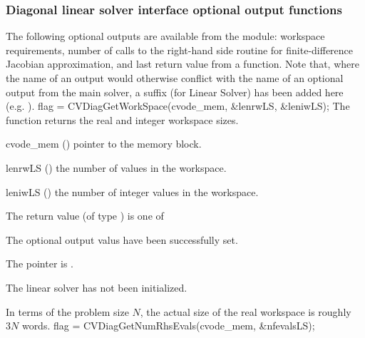 \subsubsection{Diagonal linear solver interface optional output functions}
\label{sss:optout_diag}
The following optional outputs are available from the {\cvdiag} module:
workspace requirements, number of calls to the right-hand side routine for
finite-difference Jacobian approximation, and last return value from a
{\cvdiag} function.
Note that, where the name of an output would otherwise conflict with
the name of an optional output from the main solver, a suffix 
(for Linear Solver) has been added here (e.g.  ).
{
  flag = CVDiagGetWorkSpace(cvode\_mem, \&lenrwLS, \&leniwLS);
}
{
  The function  returns the
  {\cvdiag} real and integer workspace sizes.
}
{
  \begin{args}
  \item[cvode\_mem] ()
    pointer to the {\cvode} memory block.
  \item[lenrwLS] ()
    the number of  values in the {\cvdiag} workspace.
  \item[leniwLS] ()
    the number of integer values in the {\cvdiag} workspace.
  \end{args}
}
{
  The return value  (of type ) is one of
  \begin{args}
  \item[\Id{CVDIAG\_SUCCESS}]
    The optional output valus have been successfully set.
  \item[\Id{CVDIAG\_MEM\_NULL}]
    The  pointer is .
  \item[\Id{CVDIAG\_LMEM\_NULL}]
    The {\cvdiag} linear solver has not been initialized.
  \end{args}
}
{
  In terms of the problem size $N$, the actual size of the real workspace
  is roughly $3 N$  words.
}
{
  flag = CVDiagGetNumRhsEvals(cvode\_mem, \&nfevalsLS);
}
